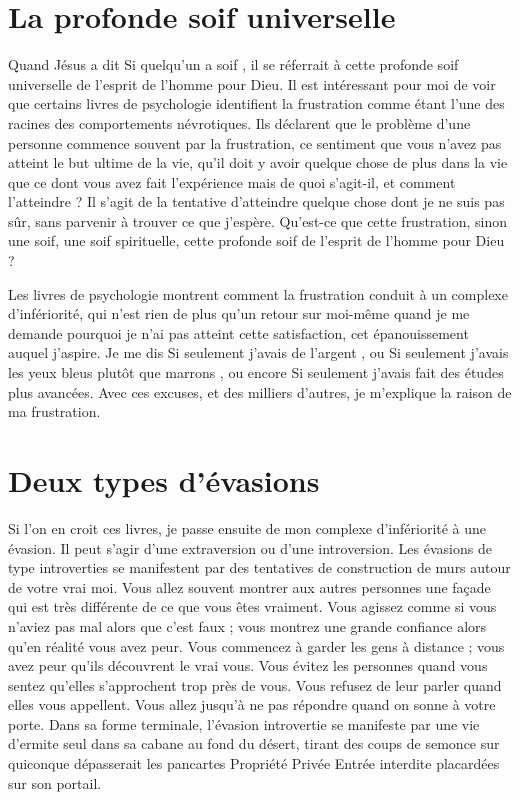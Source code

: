 \section{La profonde soif universelle}

Quand Jésus a dit\frcolon{} \Og Si quelqu'un a soif \Fg{}, il se réferrait
 à cette profonde soif universelle de l'esprit de l'homme pour Dieu.
 Il est intéressant pour moi de voir que certains livres de psychologie
 identifient la frustration comme étant l'une des racines
 des comportements névrotiques. Ils déclarent que le problème
 d'une personne commence souvent par la frustration,
 ce sentiment que vous n'avez pas atteint le but ultime de la vie,
 qu'il doit y avoir quelque chose de plus dans la vie que ce dont
 vous avez fait l'expérience \ocadr mais de quoi s'agit-il, et comment
 l'atteindre ?
 Il s'agit de la tentative d'atteindre quelque chose dont je ne suis pas sûr,
 sans parvenir à trouver ce que j'espère. Qu'est-ce que cette frustration,
 sinon une soif, une soif spirituelle, cette profonde soif de l'esprit
 de l'homme pour Dieu ?

Les livres de psychologie montrent comment la frustration con\-duit
 à un complexe d'infériorité, qui n'est rien de plus qu'un retour sur moi-même
 quand je me demande pourquoi je n'ai pas atteint cette satisfaction,
 cet épanouissement auquel j'aspire. Je me dis\frcolon{}
 \Og Si seulement j'avais de l'argent \Fg{}, ou\frcolon{}
 \Og Si seulement j'avais les yeux bleus plutôt que marrons \Fg{}, ou encore\frcolon{}
 \Og Si seulement j'avais fait des études plus avancées. \Fg{}
 Avec ces excuses, et des milliers d'autres, je m'explique la raison
 de ma frustration.


\section{Deux types d'\'evasions}

Si l'on en croit ces livres, je passe ensuite de mon complexe
 d'in\-fé\-rio\-ri\-té à une évasion.
 Il peut s'agir d'une extraversion ou d'une introversion.
 Les évasions de type introverties se manifestent par des tentatives
 de construction de murs autour de votre vrai moi.
 Vous allez souvent montrer aux autres personnes une façade qui est très
 différente de ce que vous êtes vraiment.
 Vous agissez comme si vous n'aviez pas mal alors que c'est faux ;
 vous montrez une grande confiance alors qu'en réalité vous avez peur.
 Vous commencez à garder les gens à distance ;
 vous avez peur qu'ils découvrent le vrai vous.
 Vous évitez les personnes quand vous sentez qu'elles s'approchent
 trop près de vous. Vous refusez de leur parler quand elles vous appellent.
 Vous allez jusqu'à ne pas répondre quand on sonne à votre porte.
 Dans sa forme terminale, l'évasion introvertie se manifeste par une vie
 d'ermite seul dans sa cabane au fond du désert, tirant des coups de semonce
 sur quiconque dépasserait les pancartes
 \Og Propriété Privée \ocadr Entrée interdite \Fg{} placardées sur son portail.


